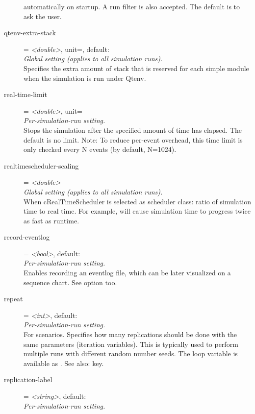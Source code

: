 \begin{description}
    automatically on startup. A run filter is also accepted. The default is to
    ask the user.
\item[qtenv-extra-stack] = \textit{<double>}, unit=, default: \\
    \textit{Global setting (applies to all simulation runs).}\\
    Specifies the extra amount of stack that is reserved for each
     simple module when the simulation is run under Qtenv.
\item[real-time-limit] = \textit{<double>}, unit=\\
    \textit{Per-simulation-run setting.}\\
    Stops the simulation after the specified amount of time has elapsed. The
    default is no limit. Note: To reduce per-event overhead, this time limit is
    only checked every N events (by default, N=1024).
\item[realtimescheduler-scaling] = \textit{<double>}\\
    \textit{Global setting (applies to all simulation runs).}\\
    When cRealTimeScheduler is selected as scheduler class: ratio of simulation
    time to real time. For example,
     will cause
    simulation time to progress twice as fast as runtime.
\item[record-eventlog] = \textit{<bool>}, default: \\
    \textit{Per-simulation-run setting.}\\
    Enables recording an eventlog file, which can be later visualized on a
    sequence chart. See  option too.
\item[repeat] = \textit{<int>}, default: \\
    \textit{Per-simulation-run setting.}\\
    For scenarios. Specifies how many replications should be done with the same
    parameters (iteration variables). This is typically used to perform
    multiple runs with different random number seeds. The loop variable is
    available as . See also:
     key.
\item[replication-label] = \textit{<string>}, default: \\
    \textit{Per-simulation-run setting.}\\

\end{description}
